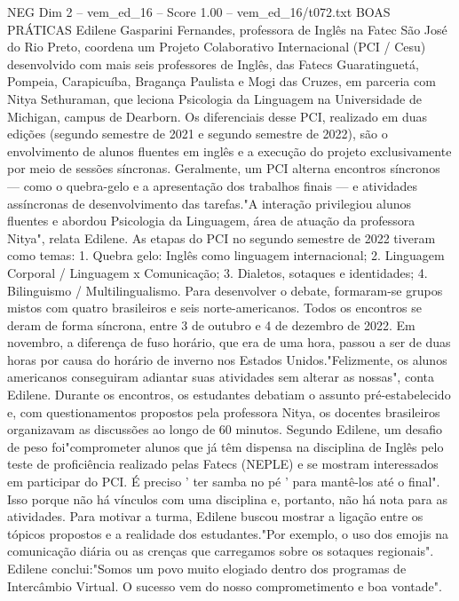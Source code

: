 \begin{textsample}{NEG Dim 2 – vem\_ed\_16 – Score 1.00 – vem\_ed\_16/t072.txt}  \label{ex:f2_neg_046}
BOAS PRÁTICAS Edilene Gasparini Fernandes, professora de Inglês na Fatec São José do Rio Preto, coordena um Projeto Colaborativo Internacional (PCI / Cesu) desenvolvido com mais seis professores de Inglês, das Fatecs Guaratinguetá, Pompeia, Carapicuíba, Bragança Paulista e Mogi das Cruzes, em parceria com Nitya Sethuraman, que leciona Psicologia da Linguagem na Universidade de Michigan, campus de Dearborn.
Os diferenciais desse PCI, realizado em duas edições (segundo semestre de 2021 e segundo semestre de 2022), são o envolvimento de alunos fluentes em inglês e a execução do projeto exclusivamente por meio de sessões síncronas.
Geralmente, um PCI alterna encontros síncronos — como o quebra-gelo e a apresentação dos trabalhos finais — e atividades assíncronas de desenvolvimento das tarefas."A interação privilegiou alunos fluentes e abordou Psicologia da Linguagem, área de atuação da professora Nitya", relata Edilene.
As etapas do PCI no segundo semestre de 2022 tiveram como temas: 1.
Quebra gelo: Inglês como linguagem internacional; 2.
Linguagem Corporal / Linguagem x Comunicação; 3.
Dialetos, sotaques e identidades; 4.
Bilinguismo / Multilingualismo.
Para desenvolver o debate, formaram-se grupos mistos com quatro brasileiros e seis norte-americanos.
Todos os encontros se deram de forma síncrona, entre 3 de outubro e 4 de dezembro de 2022.
Em novembro, a diferença de fuso horário, que era de uma hora, passou a ser de duas horas por causa do horário de inverno nos Estados Unidos."Felizmente, os alunos americanos conseguiram adiantar suas atividades sem alterar as nossas", conta Edilene.
Durante os encontros, os estudantes debatiam o assunto pré-estabelecido e, com questionamentos propostos pela professora Nitya, os docentes brasileiros organizavam as discussões ao longo de 60 minutos.
Segundo Edilene, um desafio de peso foi"comprometer alunos que já têm dispensa na disciplina de Inglês pelo teste de proficiência realizado pelas Fatecs (NEPLE) e se mostram interessados em participar do PCI.
É preciso ' ter samba no pé ' para mantê-los até o final".
Isso porque não há vínculos com uma disciplina e, portanto, não há nota para as atividades.
Para motivar a turma, Edilene buscou mostrar a ligação entre os tópicos propostos e a realidade dos estudantes."Por exemplo, o uso dos emojis na comunicação diária ou as crenças que carregamos sobre os sotaques regionais".
Edilene conclui:"Somos um povo muito elogiado dentro dos programas de Intercâmbio Virtual.
O sucesso vem do nosso comprometimento e boa vontade".

\end{textsample}
